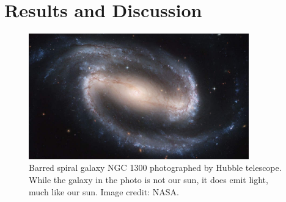 
\chapter{Results and Discussion}
\begin{refsection}

\begin{figure}[ht]
    \centering
	\includegraphics[width=0.85\textwidth]{figures/sampleFig1.jpg}
	\caption[Barred spiral galaxy NGC 1300]{Barred spiral galaxy NGC 1300 photographed by Hubble telescope. While the galaxy in the photo is not our sun, it does emit light, much like our sun. Image credit: NASA.}
	\label{fig:firstddd}
\end{figure}






\clearpage

\printbibliography[heading=subbibintoc, title={\texorpdfstring{\centering}{} Notes}]
\end{refsection}